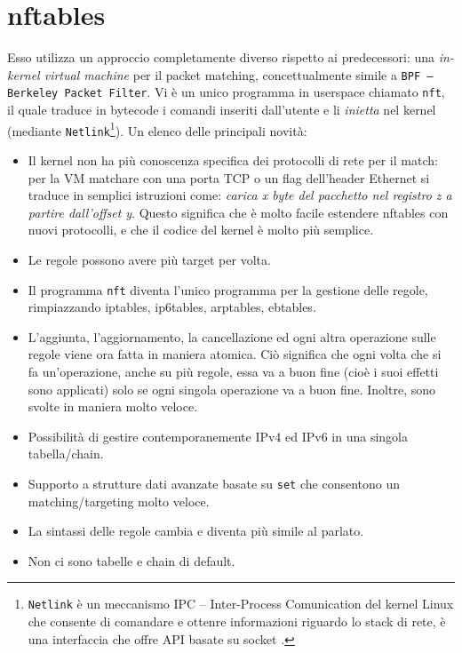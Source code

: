\section{nftables}

Esso utilizza un approccio completamente diverso rispetto ai predecessori: una
\textit{in-kernel virtual machine} per il packet matching, concettualmente
simile a \texttt{BPF -- Berkeley Packet Filter}.
Vi è un unico programma in userspace chiamato
\texttt{nft}, il quale traduce in bytecode i comandi inseriti dall'utente e li
\textit{inietta} nel kernel (mediante \texttt{Netlink}\footnote{\texttt{Netlink}
	è un meccanismo IPC -- Inter-Process Comunication del kernel Linux che consente
	di comandare e ottenre informazioni riguardo lo stack di rete, è una interfaccia
che offre API basate su socket \cite{RFC3549}.}). Un elenco
delle principali novità:
\begin{itemize}
	\item Il kernel non ha più conoscenza specifica
	      dei protocolli di rete per il match: per la VM matchare con una porta TCP o un flag dell'header Ethernet
	      si traduce in semplici istruzioni come: \textit{carica x byte del pacchetto nel
	      registro z a partire dall'offset y}. Questo significa che è molto facile estendere
	      nftables con nuovi protocolli, e che il codice del kernel è molto più semplice.
	\item Le regole possono avere più target per volta.
	\item Il programma \texttt{nft} diventa l'unico programma per la gestione delle regole,
	      rimpiazzando iptables, ip6tables, arptables, ebtables.
	\item L'aggiunta, l'aggiornamento, la cancellazione ed ogni altra operazione
	      sulle regole viene ora fatta in maniera atomica. Ciò significa che ogni volta che
	      si fa un'operazione, anche su più regole, essa va a buon fine (cioè i suoi effetti
		sono applicati) solo se ogni singola operazione va a buon fine. Inoltre, sono svolte
		in maniera molto veloce.
	\item Possibilità di gestire contemporanemente IPv4 ed IPv6 in una singola tabella/chain.
	\item Supporto a strutture dati avanzate basate su \texttt{set} che consentono un matching/targeting
	      molto veloce.
	\item La sintassi delle regole cambia e diventa più simile al parlato.
	\item Non ci sono tabelle e chain di default.
\end{itemize}

